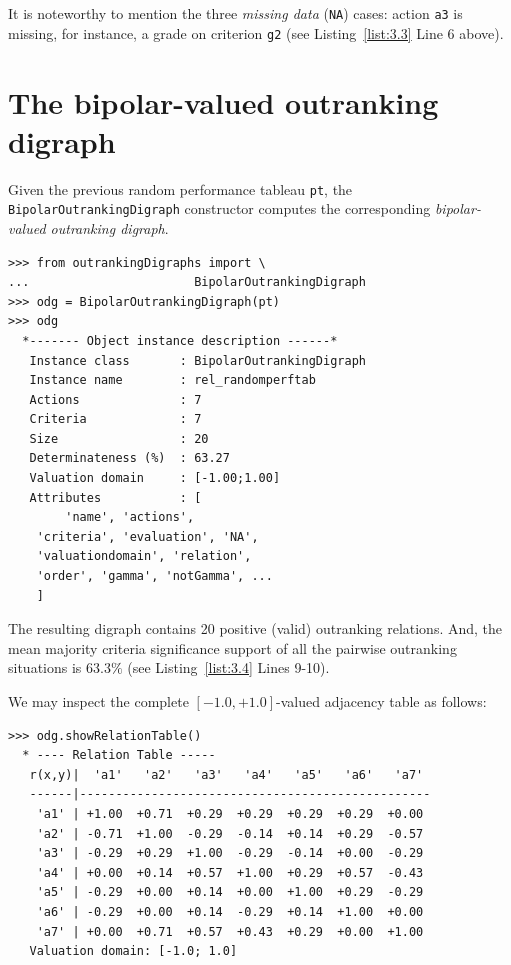 It is noteworthy to mention the three \emph{missing data} (\texttt{NA}) cases: action \texttt{a3} is missing, for instance, a grade on criterion \texttt{g2} (see Listing~\ref{list:3.3} Line 6 above).
    
\section{The bipolar-valued outranking digraph}
\label{sec:3.2}

Given the previous random performance tableau \texttt{pt}, the {\tt BipolarOutranking\-Digraph} constructor computes the corresponding \emph{bipolar-valued outranking digraph}. 
\begin{lstlisting}[caption={Example of random bipolar-valued outranking digraph.},label=list:3.4]
>>> from outrankingDigraphs import \
...                       BipolarOutrankingDigraph
>>> odg = BipolarOutrankingDigraph(pt)
>>> odg
  *------- Object instance description ------*
   Instance class       : BipolarOutrankingDigraph
   Instance name        : rel_randomperftab
   Actions              : 7
   Criteria             : 7
   Size                 : 20
   Determinateness (%)  : 63.27
   Valuation domain     : [-1.00;1.00]
   Attributes           : [
        'name', 'actions', 
	'criteria', 'evaluation', 'NA',
	'valuationdomain', 'relation', 
	'order', 'gamma', 'notGamma', ...
	]
\end{lstlisting}
The resulting digraph contains 20 positive (valid) outranking relations. And, the mean majority criteria significance support of all the pairwise outranking situations is $63.3\%$ (see Listing~\ref{list:3.4}  Lines 9-10).

We may inspect the complete $[-1.0,+1.0]$-valued adjacency table as follows:
\begin{lstlisting}[caption={Inspecting the valued adjacency table.},label=list:3.5]
>>> odg.showRelationTable()
  * ---- Relation Table -----
   r(x,y)|  'a1'   'a2'   'a3'   'a4'   'a5'   'a6'   'a7'   
   ------|-------------------------------------------------
    'a1' | +1.00  +0.71  +0.29  +0.29  +0.29  +0.29  +0.00  
    'a2' | -0.71  +1.00  -0.29  -0.14  +0.14  +0.29  -0.57  
    'a3' | -0.29  +0.29  +1.00  -0.29  -0.14  +0.00  -0.29  
    'a4' | +0.00  +0.14  +0.57  +1.00  +0.29  +0.57  -0.43  
    'a5' | -0.29  +0.00  +0.14  +0.00  +1.00  +0.29  -0.29  
    'a6' | -0.29  +0.00  +0.14  -0.29  +0.14  +1.00  +0.00  
    'a7' | +0.00  +0.71  +0.57  +0.43  +0.29  +0.00  +1.00  
   Valuation domain: [-1.0; 1.0]
\end{lstlisting}

